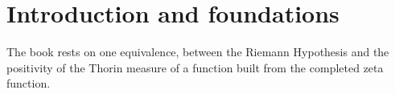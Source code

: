 \chapter{Introduction and foundations}\label{chap:foundations}

The book rests on one equivalence, between the Riemann Hypothesis and the positivity of the Thorin measure of a function built from the completed zeta function.
